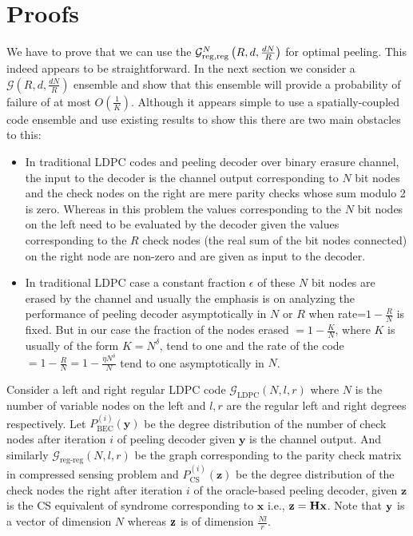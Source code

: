 \documentclass[journal,draft,onecolumn]{IEEEtran}
\begin{document}
\section{Proofs}
We have to prove that we can use the $\mathcal{G}^N_{\rm reg,reg}\left(R,d, \frac{dN}{R} \right)$ for optimal peeling. This indeed appears to be straightforward. 
In the next section we consider a $\mathcal{G}(R,d,\frac{dN}{R})$ ensemble and show that this ensemble will provide a probability of failure of at most $O\left(\frac{1}{K}\right)$. Although it appears simple to use a spatially-coupled code ensemble and use existing results to show this there are two main obstacles to this:
\begin{itemize}
\item  In traditional LDPC codes and peeling decoder over binary erasure channel, the input to the decoder is the channel output corresponding to $N$ bit nodes and the check nodes on the right are mere parity checks whose sum modulo 2 is zero. Whereas in this problem the values corresponding to the $N$ bit nodes on the left need to be evaluated by the decoder given the values corresponding to the $R$ check nodes (the real sum of the bit nodes connected) on the right node are non-zero  and are given as input to the decoder.
\item  In traditional LDPC case a constant fraction $\epsilon$ of these $N$ bit nodes are erased by the channel and usually the emphasis is on analyzing the performance of peeling decoder asymptotically in $N$ or $R$ when rate=$1-\frac{R}{N}$ is fixed. But in our case the fraction of the nodes erased $=1-\frac{K}{N}$, where $K$ is usually of the form $K=N^{\delta}$, tend to one and the rate of the code$=1-\frac{R}{N}=1-\frac{\eta N^{\delta}}{N}$ tend to one asymptotically in $N$.
\end{itemize} 

Consider a left and right regular LDPC code $\mathcal{G}_{\text{LDPC}}(N,l,r)$ where $N$ is the number of variable nodes on the left and $l,r$ are the regular left and right degrees respectively. Let $P_{\text{BEC}}^{(i)}(\mathbf{y})$ be the degree distribution of the number of check nodes after iteration $i$ of peeling decoder given $\mathbf{y}$ is the channel output. And similarly $\mathcal{G}_{\text{reg-reg}}(N,l,r)$ be the graph corresponding to the parity check matrix in compressed sensing problem and $P_{\text{CS}}^{(i)}(\mathbf{z})$ be the degree distribution of the check nodes the right after iteration $i$ of the oracle-based peeling decoder, given $\mathbf{z}$ is the CS equivalent of syndrome corresponding to $\mathbf{x}$ i.e., $\mathbf{z}=\mathbf{H}\mathbf{x}$. Note that $\mathbf{y}$ is a vector of dimension $N$ whereas $\mathbf{z}$ is of dimension $\frac{Nl}{r}$.\\
\end{document}

